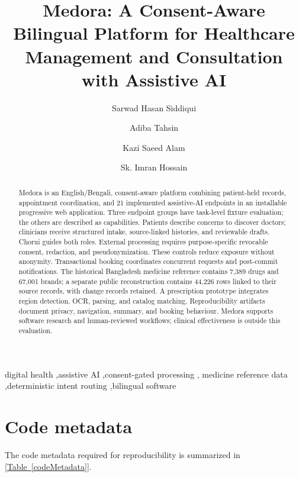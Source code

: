\documentclass[preprint,12pt,a4paper]{elsarticle}
\begin{document}
\begin{frontmatter}

\title{Medora: A Consent-Aware Bilingual Platform for Healthcare Management and Consultation with Assistive AI}

\author{Sarwad Hasan Siddiqui}
\author{Adiba Tahsin}
\author{Kazi Saeed Alam}
\author{Sk. Imran Hossain}
\address{Department of Computer Science and Engineering, Khulna University of Engineering \& Technology, Khulna 9203, Bangladesh}

\begin{abstract}
Medora is an English/Bengali, consent-aware platform combining patient-held records,
appointment coordination, and 21 implemented assistive-AI endpoints in an installable
progressive web application. Three endpoint groups have task-level fixture evaluation;
the others are described as capabilities. Patients describe concerns to discover doctors; clinicians receive
structured intake, source-linked histories, and reviewable drafts.
Chorui guides both roles. External processing requires
purpose-specific revocable consent, redaction, and pseudonymization. These controls reduce
exposure without anonymity. Transactional booking
coordinates concurrent requests and post-commit notifications. The historical Bangladesh
medicine reference contains 7,389 drugs and 67,001 brands; a separate public reconstruction
contains 44,226 rows linked to their source records, with change records retained. A
prescription prototype integrates region detection,
OCR, parsing, and catalog matching. Reproducibility artifacts document privacy, navigation,
summary, and booking behaviour. Medora supports software research and human-reviewed
workflows; clinical effectiveness is outside this evaluation.

\end{abstract}

\begin{keyword}
digital health \sep assistive AI \sep consent-gated processing \sep
medicine reference data \sep deterministic intent routing \sep bilingual software
\end{keyword}
\end{frontmatter}

\section*{Code metadata}
The code metadata required for reproducibility is summarized in [\hyperref[codeMetadata]{Table~\ref*{codeMetadata}}].
\end{document}
